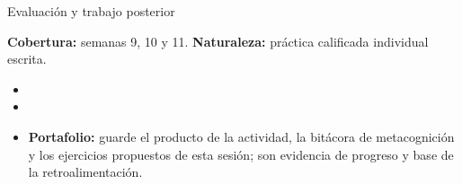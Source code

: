 \documentclass[10pt,aspectratio=169]{beamer}
\begin{document}
\begin{frame}{Evaluación y trabajo posterior}
  \small
  \begin{evalbox}
    \textbf{Cobertura:} semanas 9, 10 y 11. \textbf{Naturaleza:} práctica calificada individual escrita.
  \end{evalbox}
  \begin{itemize}
    \item \criterios
    \item \declaracionia
    \item \textbf{Portafolio:} guarde el producto de la actividad, la bitácora de metacognición y los ejercicios propuestos de esta sesión; son evidencia de progreso y base de la retroalimentación.
  \end{itemize}
\end{frame}
\end{document}

